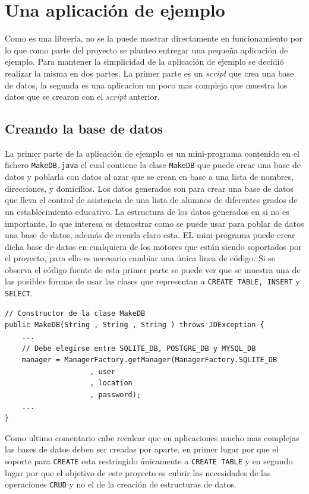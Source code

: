 \chapter{Una aplicación de ejemplo}
Como \jj es una librería, no se la puede mostrar directamente en funcionamiento por lo que como parte del proyecto se planteo entregar una pequeña aplicación de ejemplo. Para mantener la simplicidad de la aplicación de ejemplo se decidió realizar la misma en dos partes. La primer parte es un \textit{script} que crea una base de datos, la segunda es una aplicacion un poco mas compleja que muestra los datos que se crearon con el \textit{script} anterior.
\section{Creando la base de datos}
La primer parte de la aplicación de ejemplo es un mini-programa contenido en el fichero \verb=MakeDB.java= el cual contiene la clase \verb=MakeDB= que puede crear una base de datos y poblarla con datos al azar que se crean en base a una lista de nombres, direcciones, y domicilios. Los datos generados son para crear una base de datos que lleva el control de asistencia de una lista de alumnos de diferentes grados de un establecimiento educativo. La estructura de los datos generados en si no es importante, lo que interesa es demostrar como se puede usar \jj para poblar de datos una base de datos, además de crearla claro esta. EL mini-programa puede crear dicha base de datos en cualquiera de los motores que están siendo soportados por el proyecto, para ello es necesario cambiar una única linea de código. Si se observa el código fuente de esta primer parte se puede ver que se muestra una de las posibles formas de usar las clases que representan a \verb=CREATE TABLE, INSERT= y \verb=SELECT=.
\begin{lstlisting}[title=Código que debe alterarse para elegir el motor.]
// Constructor de la clase MakeDB
public MakeDB(String , String , String ) throws JDException {
	...
	// Debe elegirse entre SQLITE_DB, POSTGRE_DB y MYSQL_DB
	manager = ManagerFactory.getManager(ManagerFactory.SQLITE_DB
					, user
					, location
					, password);
	...
}
\end{lstlisting}

Como ultimo comentario cabe recalcar que en aplicaciones mucho mas complejas las bases de datos deben ser creadas por aparte, en primer lugar por que el soporte para \verb=CREATE= esta restringido únicamente a \verb=CREATE TABLE= y en segundo lugar por que el objetivo de este proyecto es cubrir las necesidades de las operaciones \verb=CRUD= y no el de la creación de estructuras de datos.
